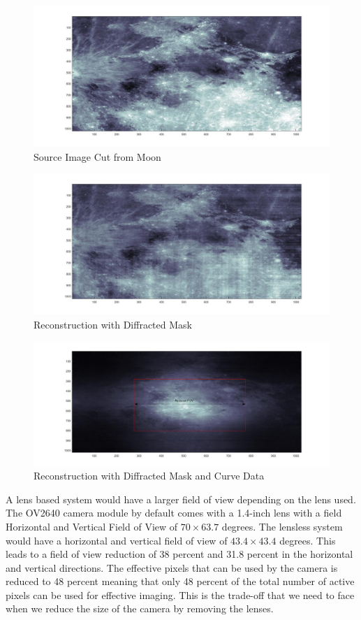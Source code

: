 \begin{figure}[]
\centering
\includegraphics[width = 0.50\linewidth]{pics/OriginalImage.jpg}
\caption{Source Image Cut from Moon}
\label{fig:Orig}
\end{figure}

\begin{figure}[]
\centering
\includegraphics[width = 0.50\linewidth]{pics/OriginalImageDiffRec.jpg}
\caption{Reconstruction with Diffracted Mask}
\label{fig:Rec_Diff}
\end{figure}

\begin{figure}[]
\centering
\includegraphics[width = 0.50\linewidth]{pics/ImageRecWithAcc.jpg}
\caption{Reconstruction with Diffracted Mask and Curve Data}
\label{fig:Rec_Acc}
\end{figure}
A lens based system would have a larger field of view depending on the lens used. The OV2640 camera module by default comes with a 1.4-inch lens with a field Horizontal and Vertical Field of View of $70 \times 63.7$ degrees\cite{OV2640Arducam}\cite{lenses}. The lensless system would have a horizontal and vertical field of view of $43.4 \times 43.4$ degrees. This leads to a field of view reduction of 38 percent and 31.8 percent in the horizontal and vertical directions. The effective pixels that can be used by the camera is reduced to 48 percent meaning that only 48 percent of the total number of active pixels can be used for effective imaging. This is the trade-off that we need to face when we reduce the size of the camera by removing the lenses.

